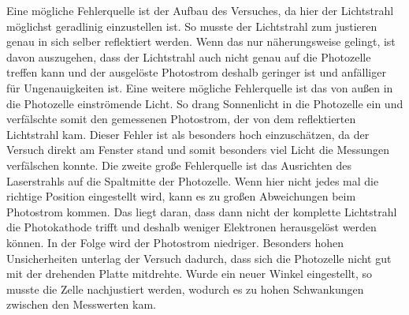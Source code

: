 Eine mögliche Fehlerquelle ist der Aufbau des Versuches, da hier der Lichtstrahl möglichst geradlinig einzustellen ist. So musste der Lichtstrahl zum justieren genau in sich selber reflektiert
werden. Wenn das nur näherungsweise gelingt, ist davon auszugehen, dass der Lichtstrahl auch nicht genau auf die Photozelle treffen kann und der ausgelöste Photostrom deshalb geringer ist und
anfälliger für Ungenauigkeiten ist. \newline
Eine weitere mögliche Fehlerquelle ist das von außen in die Photozelle einströmende Licht. So drang Sonnenlicht in die Photozelle ein und verfälschte somit den gemessenen
Photostrom, der von dem reflektierten Lichtstrahl kam. Dieser Fehler ist als besonders hoch einzuschätzen, da der Versuch direkt am Fenster stand und somit besonders viel
Licht die Messungen verfälschen konnte. \newline
Die zweite große Fehlerquelle ist das Ausrichten des Laserstrahls auf die Spaltmitte der Photozelle. Wenn hier nicht jedes mal die richtige Position eingestellt wird, kann es zu großen
Abweichungen beim Photostrom kommen. Das liegt daran, dass dann nicht der komplette Lichtstrahl die Photokathode trifft und deshalb weniger Elektronen herausgelöst werden können.
In der Folge wird der Photostrom niedriger. Besonders hohen Unsicherheiten unterlag der Versuch dadurch, dass sich die Photozelle nicht gut mit der drehenden Platte mitdrehte.
Wurde ein neuer Winkel eingestellt, so musste die Zelle nachjustiert werden, wodurch es zu hohen Schwankungen zwischen den Messwerten kam.